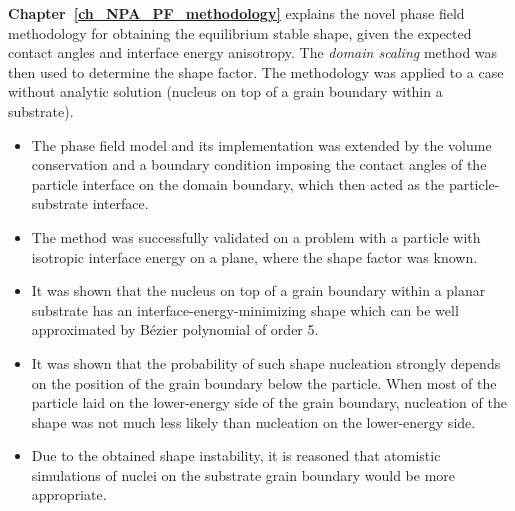 \textbf{Chapter~\ref{ch_NPA_PF_methodology}} explains the novel phase field methodology for obtaining the equilibrium stable shape, given the expected contact angles and interface energy anisotropy. The \textit{domain scaling} method was then used to determine the shape factor. The methodology was applied to a case without analytic solution (nucleus on top of a grain boundary within a substrate).
\begin{itemize}
	\item The phase field model and its implementation was extended by the volume conservation and a boundary condition imposing the contact angles of the particle interface on the domain boundary, which then acted as the particle-substrate interface.
	\item The method was successfully validated on a problem with a particle with isotropic interface energy on a plane, where the shape factor was known.
	\item It was shown that the nucleus on top of a grain boundary within a planar substrate has an interface-energy-minimizing shape which can be well approximated by Bézier polynomial of order 5.
	\item It was shown that the probability of such shape nucleation strongly depends on the position of the grain boundary below the particle. When most of the particle laid on the lower-energy side of the grain boundary, nucleation of the shape was not much less likely than nucleation on the lower-energy side.
	\item Due to the obtained shape instability, it is reasoned that atomistic simulations of nuclei on the substrate grain boundary would be more appropriate.
\end{itemize}

